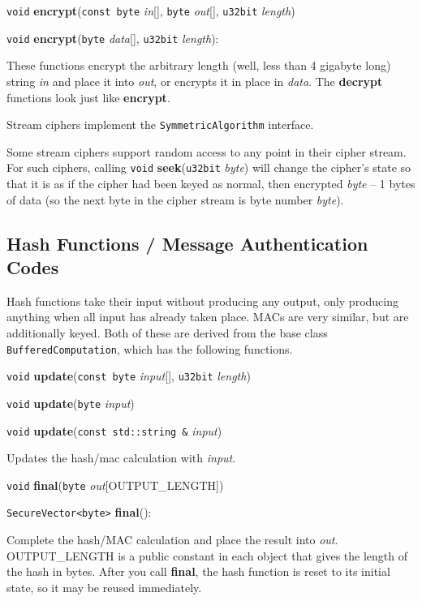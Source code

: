 \documentclass{article}
\newcommand{\function}[1]{\textbf{#1}}
\newcommand{\type}[1]{\texttt{#1}}
\renewcommand{\arg}[1]{\textsl{#1}}
\begin{document}
\noindent
\type{void} \function{encrypt}(\type{const byte} \arg{in}[], \type{byte}
\arg{out}[], \type{u32bit} \arg{length})

\noindent
\type{void} \function{encrypt}(\type{byte} \arg{data}[], \type{u32bit}
\arg{length}):

These functions encrypt the arbitrary length (well, less than 4 gigabyte long)
string \arg{in} and place it into \arg{out}, or encrypts it in place in
\arg{data}. The \function{decrypt} functions look just like
\function{encrypt}.

Stream ciphers implement the \type{SymmetricAlgorithm} interface.

Some stream ciphers support random access to any point in their cipher
stream. For such ciphers, calling \type{void} \function{seek}(\type{u32bit}
\arg{byte}) will change the cipher's state so that it is as if the cipher had been
keyed as normal, then encrypted \arg{byte} -- 1 bytes of data (so the next byte
in the cipher stream is byte number \arg{byte}).

\subsection{Hash Functions / Message Authentication Codes}

Hash functions take their input without producing any output, only producing
anything when all input has already taken place. MACs are very similar, but are
additionally keyed. Both of these are derived from the base class
\type{BufferedComputation}, which has the following functions.

\noindent
\type{void} \function{update}(\type{const byte} \arg{input}[], \type{u32bit}
\arg{length})

\noindent
\type{void} \function{update}(\type{byte} \arg{input})

\noindent
\type{void} \function{update}(\type{const std::string \&} \arg{input})

Updates the hash/mac calculation with \arg{input}.

\noindent
\type{void} \function{final}(\type{byte} \arg{out}[OUTPUT\_LENGTH])

\noindent
\type{SecureVector<byte>} \function{final}():

Complete the hash/MAC calculation and place the result into \arg{out}.
OUTPUT\_LENGTH is a public constant in each object that gives the length of the
hash in bytes. After you call \function{final}, the hash function is reset to
its initial state, so it may be reused immediately.
\end{document}
